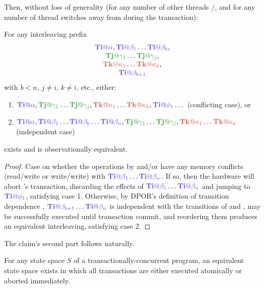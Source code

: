 Then, without loss of generality (for any number of other threads \tjj/\tkk, and for any number of thread switches away from \tii during the transaction):
\vspace{1em}

\begin{lemma}
	\label{lem:equiv}
	For any interleaving prefix
	\[
	\begin{tabular}{c}
		$\tiiat{\alpha},\tiiat{\beta_1}\dots\tiiat{\beta_b},$\\
		$\tjjat{\gamma_1}\dots\tjjat{\gamma_j},$ \\
		$\tkkat{\kappa_1}\dots\tkkat{\kappa_k},$ \\
		$\tiiat{\beta_{b+1}}$ %
	\end{tabular}
	\]
	with $b<n$, $j \ne i$, $k \ne i$, etc., either:
	\begin{enumerate}
		\item $\tiiat{\alpha},\tjjat{\gamma_1}\dots\tjjat{\gamma_j},\tkkat{\kappa_1}\dots\tkkat{\kappa_k},\tiiat{\phi_1}\dots$
			(conflicting case), or
		\item $\tiiat{\alpha},\tiiat{\beta_1}\dots\tiiat{\beta_b}\dots\tiiat{\beta_n},\tjjat{\gamma_1}\dots\tjjat{\gamma_j},\tkkat{\kappa_1}\dots\tkkat{\kappa_k}$
			(independent case)
	\end{enumerate}
	exists and is observationally equivalent.
\end{lemma}

\begin{proof}
	Case on whether the operations by \tjj and/or \tkk have any memory conflicts (read/\allowbreak{}write or write/write)
	with $\tiiat{\beta_1}\dots\tiiat{\beta_n}$.
	If so, then the hardware will abort \tii's transaction, discarding the effects of $\tiiat{\beta_1}\dots\tiiat{\beta_n}$
	and jumping to $\tiiat{\phi_1}$,
	satisfying case 1.
	Otherwise, by DPOR's definition of transition dependence \cite{dpor}, %
	$\tiiat{\beta_{b+1}}\dots\tiiat{\beta_n}$ is independent with the transitions of \tjj and \tkk,
	may be successfully executed until transaction commit,
	and reordering them produces an equivalent interleaving,
	satisfying case 2.
\end{proof}

The claim's second part follows naturally.
\vspace{1em}

\begin{theorem}
	\label{thm:atom}
	For any state space $S$ of a transactionally-concurrent program,
	an equivalent state space exists in which all transactions are either executed atomically or aborted immediately.
\end{theorem}

